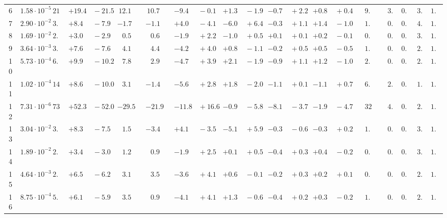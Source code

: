 \documentclass[12pt]{article}
\begin{document}
\begin{table}
\begin{tabular}{ccrr@{\hskip0pt}rrc@{\hskip0pt}r@{\hskip0pt}c@{\hskip0pt}r@{\hskip0pt}rr@{\hskip0pt}rr@{\hskip0pt}rr@{\hskip0pt}rr@{\hskip0pt}r@{\hskip0pt}r@{\hskip0pt}c|rr|r}
6 &$1.58 \cdot 10^{-5}$ &$21.6$  & ${+19.4~}$&${~-21.5}$ & $12.1$  & &$10.7$&&${-9.4~}$&${~-0.1}$ & ${+1.3~}$&${~-1.9}$ & ${-0.7~}$&${~+2.2}$ & ${+0.8~}$&${~+0.4}$ & &$ 9.6$&&$ 3.8$  & $0.97$  & $ 3.0$  & $1.04$   \\ 
7 &$2.90 \cdot 10^{-2}$ &$ 3.0$  & ${+8.4~}$&${~-7.9}$ & $-1.7$  & &$-1.1$&&${+4.0~}$&${~-4.1}$ & ${-6.0~}$&${~+6.4}$ & ${-0.3~}$&${~+1.1}$ & ${+1.4~}$&${~-1.0}$ & &$ 1.6$&&$ 0.6$  & $0.87$  & $ 4.3$  & $1.01$   \\ 
8 &$1.69 \cdot 10^{-2}$ &$ 2.1$  & ${+3.0~}$&${~-2.9}$ & $ 0.5$  & &$ 0.6$&&${-1.9~}$&${~+2.2}$ & ${-1.0~}$&${~+0.5}$ & ${+0.1~}$&${~+0.1}$ & ${+0.2~}$&${~-0.1}$ & &$ 0.9$&&$ 0.3$  & $0.90$  & $ 3.5$  & $1.02$   \\ 
9 &$3.64 \cdot 10^{-3}$ &$ 3.0$  & ${+7.6~}$&${~-7.6}$ & $ 4.1$  & &$ 4.4$&&${-4.2~}$&${~+4.0}$ & ${+0.8~}$&${~-1.1}$ & ${-0.2~}$&${~+0.5}$ & ${+0.5~}$&${~-0.5}$ & &$ 1.0$&&$ 0.8$  & $0.94$  & $ 2.8$  & $1.02$   \\ 
10 &$5.73 \cdot 10^{-4}$ &$ 6.7$  & ${+9.9~}$&${~-10.2}$ & $ 7.8$  & &$ 2.9$&&${-4.7~}$&${~+3.9}$ & ${+2.1~}$&${~-1.9}$ & ${-0.9~}$&${~+1.1}$ & ${+1.2~}$&${~-1.0}$ & &$ 2.0$&&$ 0.9$  & $0.95$  & $ 2.0$  & $1.02$   \\ 
11 &$1.02 \cdot 10^{-4}$ &$14.5$  & ${+8.6~}$&${~-10.0}$ & $ 3.1$  & &$-1.4$&&${-5.6~}$&${~+2.8}$ & ${+1.8~}$&${~-2.0}$ & ${-1.1~}$&${~+0.1}$ & ${-1.1~}$&${~+0.7}$ & &$ 6.5$&&$ 2.5$  & $0.95$  & $ 1.7$  & $1.05$   \\ 
12 &$7.31 \cdot 10^{-6}$ &$73.1$  & ${+52.3~}$&${~-52.0}$ & $-29.5$  & &$-21.9$&&${-11.8~}$&${~+16.6}$ & ${-0.9~}$&${~-5.8}$ & ${-8.1~}$&${~-3.7}$ & ${-1.9~}$&${~-4.7}$ & &$32.8$&&$ 4.2$  & $0.96$  & $ 2.3$  & $1.05$   \\ 
13 &$3.04 \cdot 10^{-2}$ &$ 3.0$  & ${+8.3~}$&${~-7.5}$ & $ 1.5$  & &$-3.4$&&${+4.1~}$&${~-3.5}$ & ${-5.1~}$&${~+5.9}$ & ${-0.3~}$&${~-0.6}$ & ${-0.3~}$&${~+0.2}$ & &$ 1.6$&&$ 0.4$  & $0.89$  & $ 3.6$  & $1.02$   \\ 
14 &$1.89 \cdot 10^{-2}$ &$ 2.1$  & ${+3.4~}$&${~-3.0}$ & $ 1.2$  & &$ 0.9$&&${-1.9~}$&${~+2.5}$ & ${+0.1~}$&${~+0.5}$ & ${-0.4~}$&${~+0.3}$ & ${+0.4~}$&${~-0.2}$ & &$ 0.8$&&$ 0.5$  & $0.91$  & $ 3.2$  & $1.02$   \\ 
15 &$4.64 \cdot 10^{-3}$ &$ 2.7$  & ${+6.5~}$&${~-6.2}$ & $ 3.1$  & &$ 3.5$&&${-3.6~}$&${~+4.1}$ & ${+0.6~}$&${~-0.1}$ & ${-0.2~}$&${~+0.3}$ & ${+0.2~}$&${~+0.1}$ & &$ 0.8$&&$ 0.9$  & $0.94$  & $ 2.5$  & $1.03$   \\ 
16 &$8.75 \cdot 10^{-4}$ &$ 5.2$  & ${+6.1~}$&${~-5.9}$ & $ 3.5$  & &$ 0.9$&&${-4.1~}$&${~+4.1}$ & ${+1.3~}$&${~-0.6}$ & ${-0.4~}$&${~+0.2}$ & ${+0.3~}$&${~-0.2}$ & &$ 1.4$&&$ 0.8$  & $0.96$  & $ 2.2$  & $1.05$   \\ 

\end{tabular}
\end{table}
\end{document}
